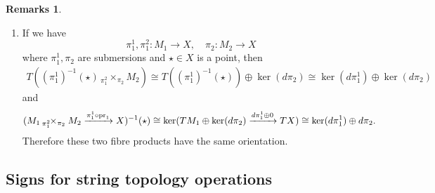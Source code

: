\documentclass[10pt]{amsart}
\numberwithin{equation}{section}
\theoremstyle{plain}
\theoremstyle{definition}
\newtheorem{remarks}[theorem]{Remarks}
\theoremstyle{remark}
\numberwithin{equation}{section}
\newcommand{\fiberprod}[2]{\,_{#1}\!\!\times_{#2} }
\newcommand{\pr}{\textup{pr}}
\begin{document}
{\begin{remarks}
\begin{enumerate}
 \item If we have \[  \pi_1^1,\pi_1^2\colon M_1\to X,\quad \pi_2\colon M_2\to X \]where $\pi_1^1,\pi_2$ are submersions and $\star\in X$ is a point, then 
 \begin{align*}
 	T((\pi_1^1)^{-1}(\star)\fiberprod{\pi_1^2}{\pi_2} M_2) \cong T((\pi_1^1)^{-1}(\star)) \oplus \ker (d\pi_2) \cong \ker (d\pi_1^1) \oplus \ker (d\pi_2)
 \end{align*}
 and 
 \begin{align*}
 	(M_1\fiberprod{\pi_1^2}{\pi_2} M_2\xrightarrow{\pi_1^1\circ \pr_1} X)^{-1}(\star) \cong \ker( TM_1\oplus \ker (d\pi_2) \xrightarrow{d\pi_1^1 \oplus 0} TX)\cong \ker (d\pi_1^1) \oplus d\pi_2.
 \end{align*}
 Therefore these two fibre products have the same orientation.
 \end{enumerate}
\end{remarks}






\subsection{Signs for string topology operations}\label{Subsc: SignOper}



}
\end{document}

